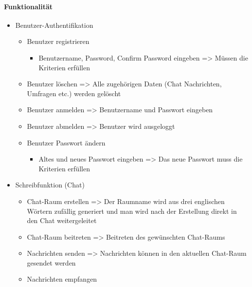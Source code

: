 \paragraph{Funktionalität}
\begin{itemize}
  \item Benutzer-Authentifikation
  \begin{itemize}
    \item Benutzer registrieren
    \begin{itemize}
      \item Benutzername, Password, Confirm Password eingeben
      \newline 
      => Müssen die Kriterien erfüllen
    \end{itemize}
    \item Benutzer löschen
    \newline
    => Alle zugehörigen Daten (Chat Nachrichten, Umfragen etc.) werden gelöscht
    \item Benutzer anmelden
    \newline
    => Benutzername und Passwort eingeben
    \item Benutzer abmelden
    \newline
    => Benutzer wird ausgeloggt
    \item Benutzer Passwort ändern
    \begin{itemize}
      \item Altes und neues Passwort eingeben
      \newline
      => Das neue Passwort muss die Kriterien erfüllen
    \end{itemize}
  \end{itemize}
  \item Schreibfunktion (Chat)
    \begin{itemize}
      \item Chat-Raum erstellen
      \newline
      => Der Raumname wird aus drei englischen Wörtern zufällig generiert und man wird nach der Erstellung direkt in den Chat weitergeleitet
      \item Chat-Raum beitreten
      \newline
      => Beitreten des gewünschten Chat-Raums
      \item Nachrichten senden
      \newline
      => Nachrichten können in den aktuellen Chat-Raum gesendet werden
      \item Nachrichten empfangen

\end{itemize}
\end{itemize}
